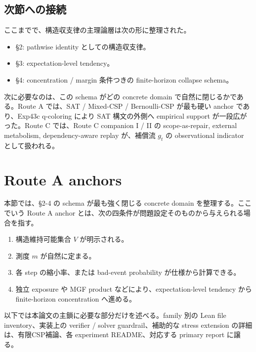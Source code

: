\documentclass[12pt,a4paper]{article}
\begin{document}
\subsection{次節への接続}\label{ux6b21ux7bc0ux3078ux306eux63a5ux7d9a-1}

ここまでで、構造収支律の主理論層は次の形に整理された。

\begin{itemize}
\tightlist
\item
  §2: pathwise identity としての構造収支律。
\item
  §3: expectation-level tendency。
\item
  §4: concentration / margin 条件つきの finite-horizon collapse schema。
\end{itemize}

次に必要なのは、この schema がどの concrete domain で自然に閉じるかである。Route A では、SAT / Mixed-CSP / Bernoulli-CSP が最も硬い anchor であり、Exp43c q-coloring により SAT 構文の外側へ empirical support が一段広がった。Route C では、Route C companion I / II の scope-as-repair, external metabolism, dependency-aware replay が、補償流 \(g_{t}\) の observational indicator として扱われる。

\section{Route A anchors}\label{route-a-anchors}

本節では、§2-4 の schema が最も強く閉じる concrete domain を整理する。ここでいう Route A anchor とは、次の四条件が問題設定そのものから与えられる場合を指す。

\begin{enumerate}
\def\labelenumi{\arabic{enumi}.}
\tightlist
\item
  構造維持可能集合 \(V\) が明示される。
\item
  測度 \(m\) が自然に定まる。
\item
  各 step の縮小率、または bad-event probability が仕様から計算できる。
\item
  独立 exposure や MGF product などにより、expectation-level tendency から finite-horizon concentration へ進める。
\end{enumerate}

以下では本論文の主鎖に必要な部分だけを述べる。family 別の Lean file inventory、実装上の verifier / solver guardrail、補助的な stress extension の詳細は、有限CSP補論、各 experiment README、対応する primary report に譲る。
\end{document}
